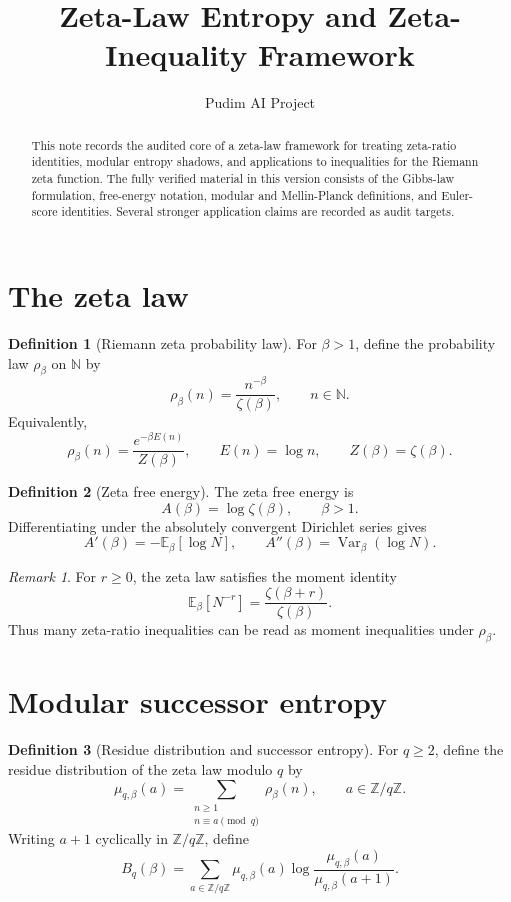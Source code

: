 \documentclass[11pt]{article}
\title{Zeta-Law Entropy and Zeta-Inequality Framework}
\author{Pudim AI Project}
\date{}
\theoremstyle{definition}
\newtheorem{definition}{Definition}
\theoremstyle{remark}
\newtheorem{remark}{Remark}
\DeclareMathOperator{\Var}{Var}
\newcommand{\E}{\mathbb E}
\newcommand{\N}{\mathbb N}
\newcommand{\Z}{\mathbb Z}
\newcommand{\1}{\mathbf 1}
\begin{document}
\maketitle

\begin{abstract}
This note records the audited core of a zeta-law framework for treating zeta-ratio identities, modular entropy shadows, and applications to inequalities for the Riemann zeta function.  The fully verified material in this version consists of the Gibbs-law formulation, free-energy notation, modular and Mellin-Planck definitions, and Euler-score identities.  Several stronger application claims are recorded as audit targets.
\end{abstract}

\section{The zeta law}

\begin{definition}[Riemann zeta probability law]
For \(\beta>1\), define the probability law \(\rho_\beta\) on \(\N\) by
\[
\rho_\beta(n)=\frac{n^{-\beta}}{\zeta(\beta)},\qquad n\in \N.
\]
Equivalently,
\[
\rho_\beta(n)=\frac{e^{-\beta E(n)}}{Z(\beta)},\qquad
E(n)=\log n,\qquad Z(\beta)=\zeta(\beta).
\]
\end{definition}

\begin{definition}[Zeta free energy]
The zeta free energy is
\[
A(\beta)=\log \zeta(\beta),\qquad \beta>1.
\]
Differentiating under the absolutely convergent Dirichlet series gives
\[
A'(\beta)=-\E_\beta[\log N],
\qquad
A''(\beta)=\Var_\beta(\log N).
\]
\end{definition}

\begin{remark}
For \(r\ge 0\), the zeta law satisfies the moment identity
\[
\E_\beta[N^{-r}]=\frac{\zeta(\beta+r)}{\zeta(\beta)}.
\]
Thus many zeta-ratio inequalities can be read as moment inequalities under \(\rho_\beta\).
\end{remark}

\section{Modular successor entropy}

\begin{definition}[Residue distribution and successor entropy]
For \(q\ge2\), define the residue distribution of the zeta law modulo \(q\) by
\[
\mu_{q,\beta}(a)=
\sum_{\substack{n\ge1\\ n\equiv a\pmod q}}\rho_\beta(n),
\qquad a\in \Z/q\Z.
\]
Writing \(a+1\) cyclically in \(\Z/q\Z\), define
\[
B_q(\beta)=
\sum_{a\in \Z/q\Z}
\mu_{q,\beta}(a)
\log\frac{\mu_{q,\beta}(a)}{\mu_{q,\beta}(a+1)}.
\]
\end{definition}
\end{document}
